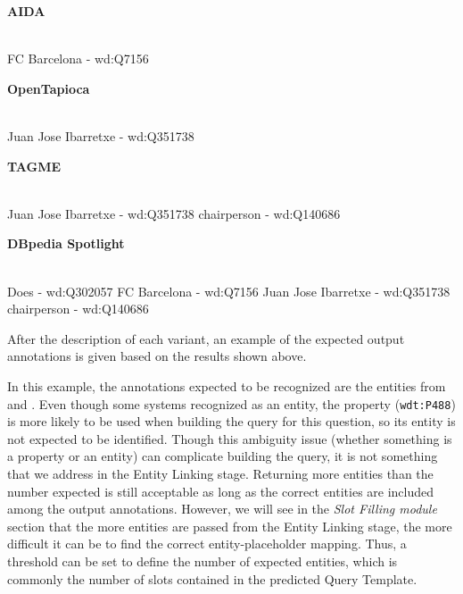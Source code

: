 \newpage

\noindent \textbf{AIDA}\\
\mbox{}\\
\begin{sparqlcode}[]
FC Barcelona - wd:Q7156
\end{sparqlcode}

\noindent \textbf{OpenTapioca}\\
\mbox{}\\
\begin{sparqlcode}[]
Juan Jose Ibarretxe - wd:Q351738  
\end{sparqlcode}

\noindent \textbf{TAGME}\\
\mbox{}\\
\begin{sparqlcode}[]
Juan Jose Ibarretxe - wd:Q351738    
chairperson - wd:Q140686  
\end{sparqlcode}

\noindent \textbf{DBpedia Spotlight}\\
\mbox{}\\
\begin{sparqlcode}[]
Does - wd:Q302057
FC Barcelona - wd:Q7156
Juan Jose Ibarretxe - wd:Q351738
chairperson - wd:Q140686    
\end{sparqlcode}

After the description of each variant, an example of the expected output annotations is given 
based on the results shown above.

In this example, the annotations expected to be recognized are the entities from  and . Even though some systems recognized 
 as an entity, the property  (\texttt{wdt:P488}) 
is more likely to be used when building the \SPARQL{} query for this question, so its entity is 
not expected to be identified. Though this ambiguity issue (whether something is a property or 
an entity) can complicate building the \SPARQL{} query, it is not something that we address in 
the Entity Linking stage. Returning more entities than the number expected is still acceptable 
as long as the correct entities are included among the output annotations. However, we will 
see in the \textit{Slot Filling module} section that the more entities are passed from the 
Entity Linking stage, the more difficult it can be to find the correct entity-placeholder 
mapping. Thus, a threshold can be set to define the number of expected entities, which is 
commonly the number of slots contained in the predicted Query Template.

